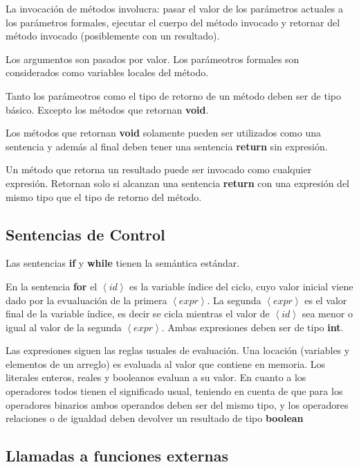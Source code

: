 \documentclass[11pt,a4paper]{article}
\begin{document}
La invocación de métodos involucra: pasar el valor de los parámetros actuales a los parámetros formales, ejecutar el cuerpo del método invocado y retornar del método invocado (posiblemente con un resultado).

Los argumentos son pasados por valor. Los parámeotros formales son considerados como variables locales del método. 

Tanto los parámeotros como el tipo de retorno de un método deben ser de tipo básico. Excepto los métodos que retornan \textbf{void}.

Los métodos que retornan \textbf{void} solamente pueden ser utilizados como una sentencia y además al final deben tener una sentencia \textbf{return} sin expresión. 

Un método que retorna un resultado puede ser invocado como cualquier expresión. Retornan solo si alcanzan una sentencia \textbf{return} con una expresión del mismo tipo que el tipo de retorno del método.

\subsection{Sentencias de Control}
\label{control}

Las sentencias \textbf{if} y \textbf{while} tienen la semántica estándar. 

En la sentencia \textbf{for} el $\left\langle id \right\rangle$  es la variable índice del ciclo, cuyo valor inicial viene dado por la evualuación de la primera $\left\langle expr \right\rangle$. La segunda $\left\langle expr \right\rangle$ es el valor final de la variable índice, es decir se cicla mientras el valor de $\left\langle id \right\rangle$ sea menor o igual al valor de la segunda $\left\langle expr \right\rangle$. Ambas expresiones deben ser de tipo \textbf{int}. 

Las expresiones siguen las reglas usuales de evaluación. Una locación (variables y elementos de un arreglo) es evaluada al valor que contiene en memoria. Los literales enteros, reales y booleanos evaluan a su valor. En cuanto a los operadores todos tienen el significado usual, teniendo en cuenta de que para los operadores binarios ambos operandos deben ser del mismo tipo, y los operadores relaciones o de igualdad deben devolver un resultado de tipo \textbf{boolean}

\subsection{Llamadas a funciones externas}
\label{externas}
\end{document}
